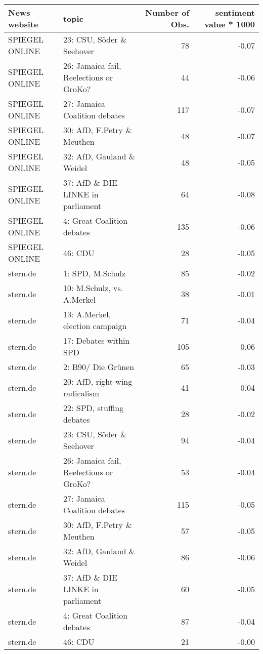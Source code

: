 \begin{adjustbox}{width=\textwidth}
\begin{tabular}{llrr}
  \hline
News website & topic & Number of Obs. & sentiment value * 1000 \\ 
  \hline
SPIEGEL ONLINE & 23: CSU, Söder \& Seehover &  78 & -0.07 \\ 
  SPIEGEL ONLINE & 26: Jamaica fail, Reelections or GroKo? &  44 & -0.06 \\ 
  SPIEGEL ONLINE & 27: Jamaica Coalition debates & 117 & -0.07 \\ 
  SPIEGEL ONLINE & 30: AfD, F.Petry \& Meuthen &  48 & -0.07 \\ 
  SPIEGEL ONLINE & 32: AfD, Gauland \& Weidel &  48 & -0.05 \\ 
  SPIEGEL ONLINE & 37: AfD \& DIE LINKE in parliament &  64 & -0.08 \\ 
  SPIEGEL ONLINE & 4: Great Coalition debates & 135 & -0.06 \\ 
  SPIEGEL ONLINE & 46: CDU &  28 & -0.05 \\ 
  stern.de & 1: SPD, M.Schulz &  85 & -0.02 \\ 
  stern.de & 10: M.Schulz, vs. A.Merkel &  38 & -0.01 \\ 
  stern.de & 13: A.Merkel, election campaign &  71 & -0.04 \\ 
  stern.de & 17: Debates within SPD & 105 & -0.06 \\ 
  stern.de & 2: B90/ Die Grünen &  65 & -0.03 \\ 
  stern.de & 20: AfD, right-wing radicalism &  41 & -0.04 \\ 
  stern.de & 22: SPD, stuffing debates &  28 & -0.02 \\ 
  stern.de & 23: CSU, Söder \& Seehover &  94 & -0.04 \\ 
  stern.de & 26: Jamaica fail, Reelections or GroKo? &  53 & -0.04 \\ 
  stern.de & 27: Jamaica Coalition debates & 115 & -0.05 \\ 
  stern.de & 30: AfD, F.Petry \& Meuthen &  57 & -0.05 \\ 
  stern.de & 32: AfD, Gauland \& Weidel &  86 & -0.06 \\ 
  stern.de & 37: AfD \& DIE LINKE in parliament &  60 & -0.05 \\ 
  stern.de & 4: Great Coalition debates &  87 & -0.04 \\ 
  stern.de & 46: CDU &  21 & -0.00 \\ 

\end{tabular}
\end{adjustbox}
